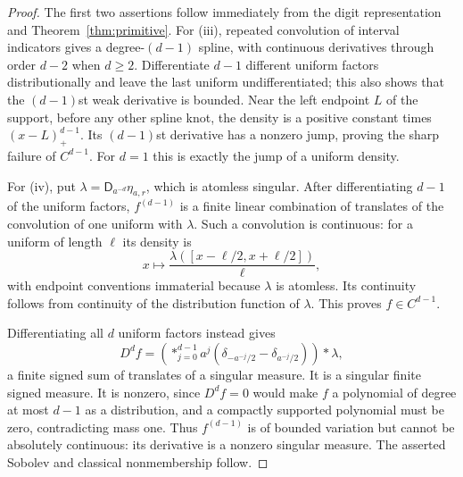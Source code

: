 \documentclass[11pt,a4paper]{article}
\theoremstyle{definition}
\theoremstyle{remark}
\newcommand{\D}{\mathsf D}
\begin{document}
\begin{proof}
The first two assertions follow immediately from the digit representation
and Theorem~\ref{thm:primitive}. For (iii), repeated convolution of interval
indicators gives a degree-$(d-1)$ spline, with continuous derivatives
through order $d-2$ when $d\ge2$. Differentiate $d-1$ different uniform
factors distributionally and leave the last uniform undifferentiated;
this also shows that the $(d-1)$st weak derivative is bounded.
Near the left endpoint $L$ of the support, before any other spline knot,
the density is a positive constant times $(x-L)_+^{d-1}$.
Its $(d-1)$st derivative has a nonzero jump, proving the sharp failure
of $C^{d-1}$. For $d=1$ this is exactly the jump of a uniform density.

For (iv), put $\lambda=\D_{a^{-d}}\eta_{a,r}$, which is atomless singular.
After differentiating $d-1$ of the uniform factors, $f^{(d-1)}$ is a finite
linear combination of translates of the convolution of one uniform with
$\lambda$. Such a convolution is continuous: for a uniform of length
$\ell$ its density is
\[
 x\longmapsto \frac{\lambda([x-\ell/2,x+\ell/2])}{\ell},
\]
with endpoint conventions immaterial because $\lambda$ is atomless.
Its continuity follows from continuity of the distribution function of
$\lambda$. This proves $f\in C^{d-1}$.

Differentiating all $d$ uniform factors instead gives
\begin{equation}\label{eq:singular-derivative}
 D^df=\left(\mathop{*}_{j=0}^{d-1}
 a^j(\delta_{-a^{-j}/2}-\delta_{a^{-j}/2})\right)*\lambda,
\end{equation}
a finite signed sum of translates of a singular measure. It is a singular
finite signed measure. It is nonzero, since $D^df=0$ would make $f$ a
polynomial of degree at most $d-1$ as a distribution, and a compactly
supported polynomial must be zero, contradicting mass one. Thus
$f^{(d-1)}$ is of bounded variation but cannot be absolutely continuous:
its derivative is a nonzero singular measure. The asserted Sobolev and
classical nonmembership follow.
\end{proof}
\end{document}

